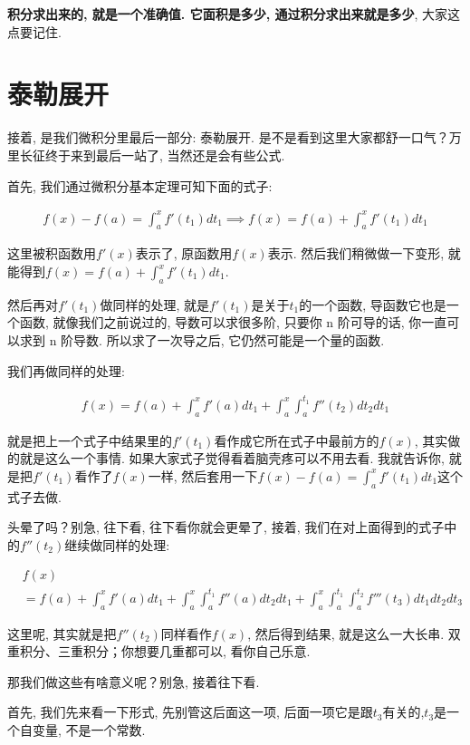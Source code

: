 \textbf{积分求出来的, 就是一个准确值. 它面积是多少, 通过积分求出来就是多少}, 大家这点要记住. 

\section{泰勒展开}

接着, 是我们微积分里最后一部分: 泰勒展开. 是不是看到这里大家都舒一口气？万里长征终于来到最后一站了, 当然还是会有些公式. 

首先, 我们通过微积分基本定理可知下面的式子: 

\begin{align*}
  f(x) - f(a)  = \int_a^xf'(t_1)dt_1 \implies f(x) = f(a) + \int_a^xf'(t_1)dt_1
\end{align*}

这里被积函数用$f'(x)$表示了, 原函数用$f(x)$表示. 然后我们稍微做一下变形, 就能得到$f(x) = f(a) + \int_a^xf'(t_1)dt_1$. 

然后再对$f'(t_1)$做同样的处理, 就是$f'(t_1)$是关于$t_1$的一个函数, 导函数它也是一个函数, 就像我们之前说过的, 导数可以求很多阶, 只要你 n 阶可导的话, 你一直可以求到 n 阶导数. 所以求了一次导之后, 它仍然可能是一个量的函数. 

我们再做同样的处理: 

\begin{align*}
  f(x) = f(a) + \int_a^xf'(a)dt_1 + \int_a^x \int_a^{t_1} f''(t_2)dt_2dt_1
\end{align*}

就是把上一个式子中结果里的$f'(t_1)$看作成它所在式子中最前方的$f(x)$, 其实做的就是这么一个事情. 如果大家式子觉得看着脑壳疼可以不用去看. 我就告诉你, 就是把$f'(t_1)$看作了$f(x)$一样, 然后套用一下$f(x) - f(a)  = \int_a^xf'(t_1)dt_1 $这个式子去做. 

头晕了吗？别急, 往下看, 往下看你就会更晕了, 接着, 我们在对上面得到的式子中的$f''(t_2)$继续做同样的处理: 

\begin{align*}
  & f(x) \\ & = f(a)+\int_a^xf'(a)dt_1 + \int_a^x \int_a^{t_1} f''(a)dt_2dt_1+\int_a^x\int_a^{t_1}\int_a^{t_2}f'''(t_3)dt_1dt_2dt_3
\end{align*}

这里呢, 其实就是把$f''(t_2)$同样看作$f(x)$, 然后得到结果, 就是这么一大长串. 双重积分、三重积分；你想要几重都可以, 看你自己乐意. 

那我们做这些有啥意义呢？别急, 接着往下看. 

首先, 我们先来看一下形式, 先别管这后面这一项, 后面一项它是跟$t_3$有关的,$t_3$是一个自变量, 不是一个常数. 

